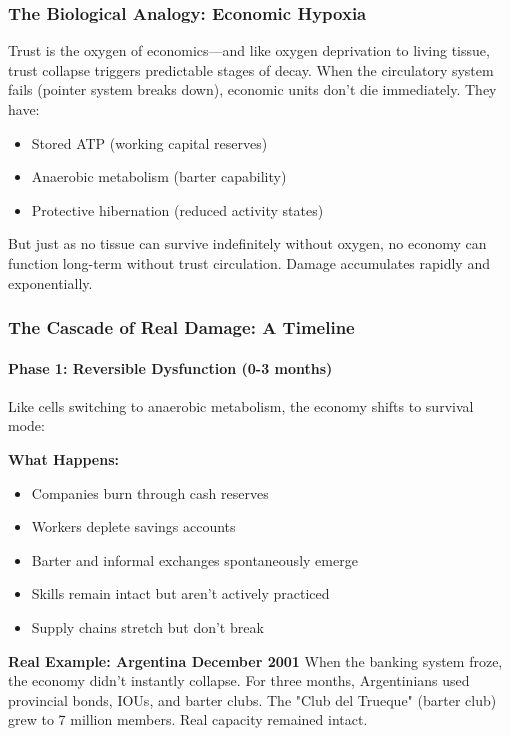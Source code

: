 \documentclass[11pt,oneside]{book}
\begin{document}
\subsubsection{The Biological Analogy: Economic Hypoxia}

Trust is the oxygen of economics—and like oxygen deprivation to living tissue, trust collapse triggers predictable stages of decay. When the circulatory system fails (pointer system breaks down), economic units don't die immediately. They have:
\begin{itemize}
\item Stored ATP (working capital reserves)
\item Anaerobic metabolism (barter capability)
\item Protective hibernation (reduced activity states)
\end{itemize}

But just as no tissue can survive indefinitely without oxygen, no economy can function long-term without trust circulation. Damage accumulates rapidly and exponentially.

\subsubsection{The Cascade of Real Damage: A Timeline}

\paragraph{Phase 1: Reversible Dysfunction (0-3 months)}
Like cells switching to anaerobic metabolism, the economy shifts to survival mode:

\textbf{What Happens:}
\begin{itemize}
\item Companies burn through cash reserves
\item Workers deplete savings accounts
\item Barter and informal exchanges spontaneously emerge
\item Skills remain intact but aren't actively practiced
\item Supply chains stretch but don't break
\end{itemize}

\textbf{Real Example: Argentina December 2001}
When the banking system froze, the economy didn't instantly collapse. For three months, Argentinians used provincial bonds, IOUs, and barter clubs. The "Club del Trueque" (barter club) grew to 7 million members. Real capacity remained intact.
\end{document}
